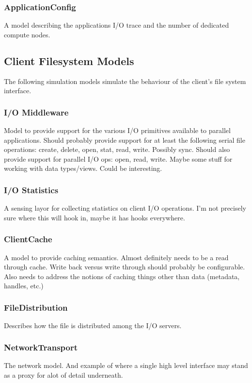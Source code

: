 \documentclass[11pt]{article}
\begin{document}
\subsubsection{ApplicationConfig}
A model describing the applications I/O trace and the number of dedicated
compute nodes.

\subsection{Client Filesystem Models}
The following simulation models simulate the behaviour of the client's file
system interface.

\subsubsection{I/O Middleware}
Model to provide support for the various I/O primitives available to parallel
applications.  Should probably provide support for at least the following
serial file operations:  create, delete, open, stat, read, write.  Possibly 
sync.  Should also provide support for parallel I/O ops: open, read, write.
Maybe some stuff for working with data types/views.  Could be interesting.

\subsubsection{I/O Statistics}
A sensing layor for collecting statistics on client I/O operations.  I'm not
precisely sure where this will hook in, maybe it has hooks everywhere.

\subsubsection{ClientCache}
A model to provide caching semantics.  Almost definitely needs to be a read
through cache.  Write back versus write through should probably be
configurable.  Also needs to address the notions of caching things other than
data (metadata, handles, etc.)

\subsubsection{FileDistribution}
Describes how the file is distributed among the I/O servers.

\subsubsection{NetworkTransport}
The network model.  And example of where a single high level interface may
stand as a proxy for alot of detail underneath.
\end{document}
